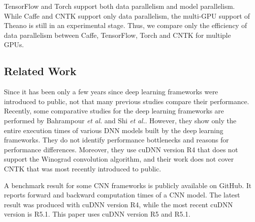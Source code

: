 TensorFlow and Torch support both data parallelism and model parallelism. While Caffe and CNTK support only data parallelism, the multi-GPU support of Theano is still in an experimental stage. Thus, we compare only the efficiency of data parallelism between Caffe, TensorFlow, Torch and CNTK for multiple GPUs. 

\subsection{Related Work}
Since it has been only a few years since deep learning frameworks were introduced to public, not that many previous studies compare their performance. Recently, some comparative studies for the deep learning frameworks are performed by Bahrampour \textit{et al.}\cite{DBLP:journals/corr/BahrampourRSS15} and Shi \textit{et al.}\cite{DBLP:journals/corr/ShiWXC16}. However, they show only the entire execution times of various DNN models built by the deep learning frameworks. They do not identify performance bottlenecks and reasons for performance differences. Moreover, they use cuDNN version R4 that does not support the Winograd convolution algorithm, and their work does not cover CNTK that was most recently introduced to public.

A benchmark result for some CNN frameworks is publicly available on GitHub\cite{convnet-benchmarks}. It reports forward and backward computation times of a CNN model. The latest result was produced with cuDNN version R4, while the most recent cuDNN version is R5.1. This paper uses cuDNN version R5 and R5.1.
